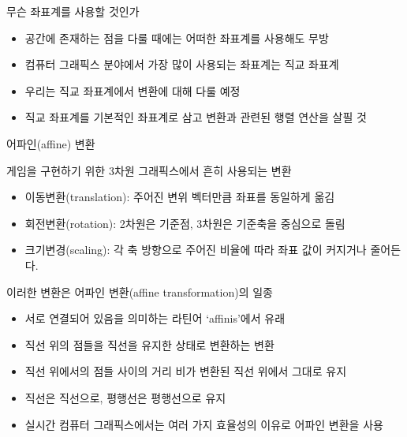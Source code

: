 \begin{frame}{무슨 좌표계를 사용할 것인가}

\begin{itemize}
\item 공간에 존재하는 점을 다룰 때에는 어떠한 좌표계를 사용해도 무방
\item 컴퓨터 그래픽스 분야에서 가장 많이 사용되는 좌표계는 직교 좌표계
\item 우리는 직교 좌표계에서 변환에 대해 다룰 예정
\item 직교 좌표계를 기본적인 좌표계로 삼고 변환과 관련된 행렬 연산을 살필 것
\end{itemize}

\end{frame}


\begin{frame}{어파인(affine) 변환}

{\small
게임을 구현하기 위한 3차원 그래픽스에서 흔히 사용되는 변환

\begin{itemize}
\item 이동변환(translation): 주어진 변위 벡터만큼 좌표를 동일하게 옮김
\item 회전변환(rotation): 2차원은 기준점, 3차원은 기준축을 중심으로 돌림
\item 크기변경(scaling): 각 축 방향으로 주어진 비율에 따라 좌표 값이 커지거나 줄어든다.
\end{itemize}

이러한 변환은 어파인 변환(affine transformation)의 일종
\begin{itemize}
\item 서로 연결되어 있음을 의미하는 라틴어 `affinis'에서 유래
\item 직선 위의 점들을 직선을 유지한 상태로 변환하는 변환
\item 직선 위에서의 점들 사이의 거리 비가 변환된 직선 위에서 그대로 유지
\item 직선은 직선으로, 평행선은 평행선으로 유지
\item 실시간 컴퓨터 그래픽스에서는 여러 가지 효율성의 이유로 어파인 변환을 사용
\end{itemize}
}

\end{frame}


